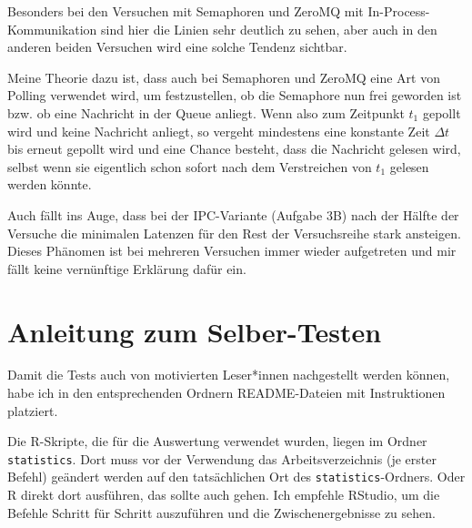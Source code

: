 \documentclass[12pt]{article}
\begin{document}
Besonders bei den Versuchen mit Semaphoren und ZeroMQ mit In-Process-Kommunikation sind hier die Linien sehr deutlich zu sehen, aber auch in den anderen beiden Versuchen wird eine solche Tendenz sichtbar.

Meine Theorie dazu ist, dass auch bei Semaphoren und ZeroMQ eine Art von Polling verwendet wird, um festzustellen, ob die Semaphore nun frei geworden ist bzw. ob eine Nachricht in der Queue anliegt.
Wenn also zum Zeitpunkt $t_1$ gepollt wird und keine Nachricht anliegt, so vergeht mindestens eine konstante Zeit $\Delta t$ bis erneut gepollt wird und eine Chance besteht, dass die Nachricht gelesen wird, selbst wenn sie eigentlich schon sofort nach dem Verstreichen von $t_1$ gelesen werden könnte.

Auch fällt ins Auge, dass bei der IPC-Variante (Aufgabe 3B) nach der Hälfte der Versuche die minimalen Latenzen für den Rest der Versuchsreihe stark ansteigen.
Dieses Phänomen ist bei mehreren Versuchen immer wieder aufgetreten und mir fällt keine vernünftige Erklärung dafür ein.

\section{Anleitung zum Selber-Testen}
Damit die Tests auch von motivierten Leser*innen nachgestellt werden können, habe ich in den entsprechenden Ordnern README-Dateien mit Instruktionen platziert.

Die R-Skripte, die für die Auswertung verwendet wurden, liegen im Ordner \texttt{statistics}. Dort muss vor der Verwendung das Arbeitsverzeichnis (je erster Befehl) geändert werden auf den tatsächlichen Ort des \texttt{statistics}-Ordners.
Oder R direkt dort ausführen, das sollte auch gehen.
Ich empfehle RStudio, um die Befehle Schritt für Schritt auszuführen und die Zwischenergebnisse zu sehen.
\end{document}
